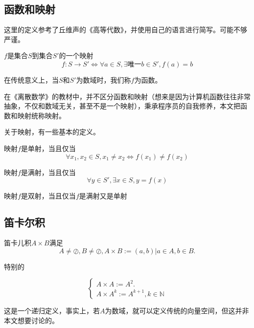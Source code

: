 \documentclass[12pt,hyperref,a4paper,UTF8]{ctexart}
\begin{document}

\subsection{函数和映射}
这里的定义参考了丘维声的《高等代数》，并使用自己的语言进行简写。可能不够严谨。
\begin{Definition}
$f$是集合$S$到集合$S'$的一个映射
    $$f:S\rightarrow S'\Longleftrightarrow \forall a\in S , \exists \text{唯一} b\in S' ,f(a)=b
    $$
\end{Definition}


在传统意义上，当$S$和$S'$为数域时，我们称$f$为函数。

在《离散数学》的教材中，并不区分函数和映射（想来是因为计算机函数往往非常抽象，不仅和数域无关，甚至不是一个映射），秉承程序员的自我修养，本文把函数和映射统称映射。

关于映射，有一些基本的定义。
\begin{Definition}
映射$f$是单射，当且仅当
    $$\forall x_1,x_2\in S,x_1\ne x_2\Longleftrightarrow f\left( x_1 \right) \ne f\left( x_2 \right) $$
\end{Definition}

\begin{Definition}
映射$f$是满射，当且仅当
    $$\forall y\in S',\exists x \in S, y=f(x) $$
\end{Definition}

\begin{Definition}
映射$f$是双射，当且仅当$f$是满射又是单射
\end{Definition}


\subsection{笛卡尔积}

\begin{Definition}
笛卡儿积$A\times B$满足
$$
A\neq \oslash ,B\neq \oslash, A\times B:={(a,b)|a\in A,b\in B}.
$$
\end{Definition}

特别的

\begin{Definition}
$$    \begin{cases}
        A\times A :=A^2.\\
        A\times A^k :=A^{k+1}, k\in \mathbb{N}
    \end{cases}$$

\end{Definition}
这是一个递归定义，事实上，若$A$为数域，就可以定义传统的向量空间，但这并非本文想要讨论的。
\end{document}
